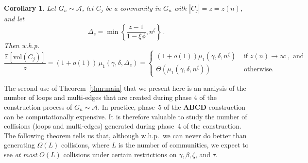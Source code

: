 \documentclass[12pt]{article}
\newtheorem{corollary}[theorem]{Corollary}
\theoremstyle{definition}
\theoremstyle{remark}
\theoremstyle{remark}
\numberwithin{theorem}{section}
\newcommand{\E}[1]{{\mathbb E}\left[#1\right]}
\newcommand{\abcdDist}{\ensuremath{\mathcal{A}}}
\newcommand{\moment}[2]{\ensuremath{\mu_{#1}(#2)}}
\begin{document}
\begin{corollary}\label{cor:volumes}
Let $G_n \sim \abcdDist$, let $C_j$ be a community in $G_n$ with $|C_j| = z = z(n)$, and let 
\[
\Delta_z = \min \left\{ \frac{z-1}{1-\xi \phi} , n^\zeta \right\} \,.
\]
Then w.h.p.\
\[
\frac{\E{\mathrm{vol}(C_j)}}{z} = (1+o(1)) \, \moment{1}{\gamma,\delta,\Delta_z}  = 
\begin{cases} 
\left(1+o(1) \right) \moment{1}{\gamma,\delta,n^\zeta} & \text{ if } z(n) \to \infty \,, \text{ and} \\
\Theta\left( \moment{1}{\gamma,\delta,n^\zeta} \right) & \text{ otherwise.}
\end{cases}
\]
\end{corollary}

The second use of Theorem~\ref{thm:main} that we present here is an analysis of the number of loops and multi-edges that are created during phase 4 of the construction process of $G_n \sim \abcdDist$. In practice, phase~5 of the \textbf{ABCD} construction can be computationally expensive. It is therefore valuable to study the number of collisions (loops and multi-edges) generated during phase~4 of the construction. The following theorem tells us that, although w.h.p.\ we can never do better than generating $\Omega(L)$ collisions, where $L$ is the number of communities, we expect to see \textit{at most} $O(L)$ collisions under certain restrictions on $\gamma,\beta,\zeta$, and $\tau$.
\end{document}
